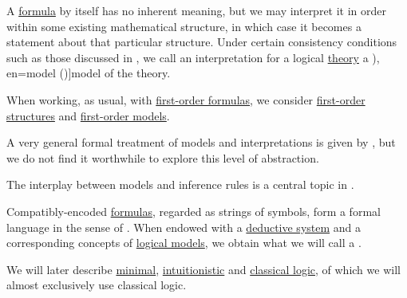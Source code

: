 \begin{definition}\label{def:logical_model}\mimprovised
  A \hyperref[def:logical_formula]{formula} by itself has no inherent meaning, but we may interpret it in order within some existing mathematical structure, in which case it becomes a statement about that particular structure. Under certain consistency conditions such as those discussed in , we call an interpretation for a logical \hyperref[def:logical_theory]{theory} a \term[ru=модель (\cite[def. 1.1.10]{Герасимов2011}), en=model (\cite[4]{Hinman2005})]{model} of the theory.

  When working, as usual, with \hyperref[def:first_order_syntax/formula]{first-order formulas}, we consider \hyperref[def:first_order_structure]{first-order structures} and \hyperref[def:first_order_model]{first-order models}.
\end{definition}
\begin{comments}
  \item A very general formal treatment of models and interpretations is given by , but we do not find it worthwhile to explore this level of abstraction.

  \item The interplay between models and inference rules is a central topic in .
\end{comments}

\begin{definition}\label{def:logical_framework}
  Compatibly-encoded \hyperref[def:logical_formula]{formulas}, regarded as strings of symbols, form a formal language in the sense of . When endowed with a \hyperref[def:deductive_system]{deductive system} and a corresponding concepts of \hyperref[def:logical_model]{logical models}, we obtain what we will call a .
\end{definition}
\begin{comments}
  \item We will later describe \hyperref[def:minimal_logic]{minimal}, \hyperref[def:intuitionistic_logic]{intuitionistic} and \hyperref[def:classical_logic]{classical logic}, of which we will almost exclusively use classical logic.
\end{comments}

